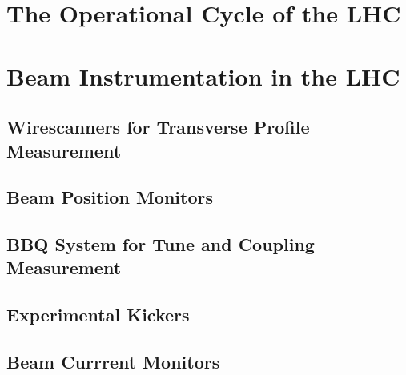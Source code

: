 
\section{The Operational Cycle of the LHC}


\section{Beam Instrumentation in the LHC}

\subsection{Wirescanners for Transverse Profile Measurement}

\subsection{Beam Position Monitors}

\subsection{BBQ System for Tune and Coupling Measurement}

\subsection{Experimental Kickers}

\subsection{Beam Currrent Monitors}

